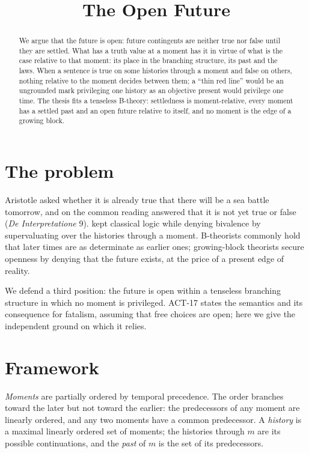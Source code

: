 \documentclass{situationist-preprint}
\title{The Open Future}
\begin{document}
\maketitle

\begin{abstract}
We argue that the future is open: future contingents are neither true nor false until they are settled. What has a truth value at a moment has it in virtue of what is the case relative to that moment: its place in the branching structure, its past and the laws. When a sentence is true on some histories through a moment and false on others, nothing relative to the moment decides between them; a \enquote{thin red line} would be an ungrounded mark privileging one history as an objective present would privilege one time. The thesis fits a tenseless B-theory: settledness is moment-relative, every moment has a settled past and an open future relative to itself, and no moment is the edge of a growing block.
\end{abstract}

\section{The problem}

Aristotle asked whether it is already true that there will be a sea battle tomorrow, and on the common reading answered that it is not yet true or false (\emph{De Interpretatione} 9). \citet{Thomason1970} kept classical logic while denying bivalence by supervaluating over the histories through a moment. B-theorists \citep{Williams1951,Sider2001} commonly hold that later times are as determinate as earlier ones; growing-block theorists \citep{Broad1923} secure openness by denying that the future exists, at the price of a present edge of reality.

We defend a third position: the future is open within a tenseless branching structure in which no moment is privileged. ACT-17 states the semantics and its consequence for fatalism, assuming that free choices are open; here we give the independent ground on which it relies.

\section{Framework}

\begin{definition}\label{d:branch}
\emph{Moments} are partially ordered by temporal precedence. The order branches toward the later but not toward the earlier: the predecessors of any moment are linearly ordered, and any two moments have a common predecessor. A \emph{history} is a maximal linearly ordered set of moments; the histories through $m$ are its possible continuations, and the \emph{past} of $m$ is the set of its predecessors.
\end{definition}
\end{document}
